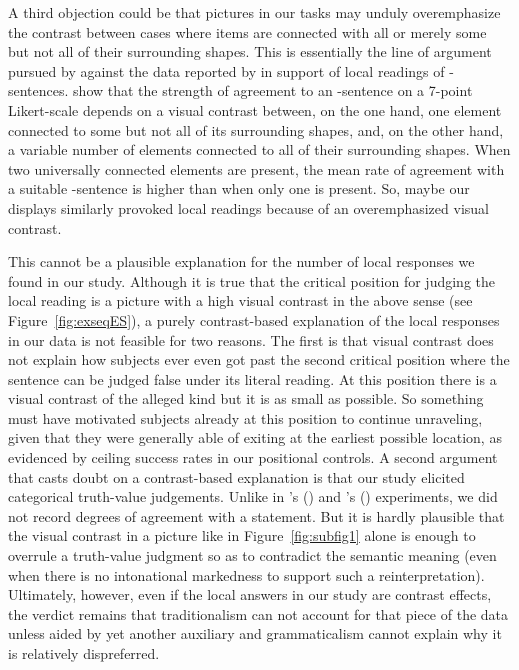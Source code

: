 \documentclass[fleqn,reqno,10pt,draft]{article}
\renewcommand{\es}{\acro{es}}
\begin{document}
A third objection could be that pictures in our tasks may unduly
overemphasize the contrast between cases where items are connected
with all or merely some but not all of their surrounding shapes. This
is essentially the line of argument pursued by
\citet{GeurtsTielvan-Tiel2013:Scalar-expressi} against the data
reported by \citet{ChemlaSpector2010:Experimental-Ev} in support of
local readings of
\es-sentences. \citeauthor{GeurtsTielvan-Tiel2013:Scalar-expressi}
show that the strength of agreement to an \es-sentence on a 7-point
Likert-scale depends on a visual contrast between, on the one hand,
one element connected to some but not all of its surrounding shapes,
and, on the other hand, a variable number of elements connected to all
of their surrounding shapes. When two universally connected elements
are present, the mean rate of agreement with a suitable \es-sentence
is higher than when only one is present. So, maybe our displays
similarly provoked local readings because of an overemphasized visual
contrast.

This cannot be a plausible explanation for the number of local
responses we found in our study. Although it is true that the critical
position for judging the local reading is a picture with a high visual
contrast in the above sense (see Figure~\ref{fig:exseqES}), a purely
contrast-based explanation of the local responses in our data is not
feasible for two reasons. The first is that visual contrast does not
explain how subjects ever even got past the second critical position
where the sentence can be judged false under its literal reading. At
this position there is a visual contrast of the alleged kind but it is
as small as possible. So something must have motivated subjects
already at this position to continue unraveling, given that they were
generally able of exiting at the earliest possible location, as
evidenced by ceiling success rates in our positional controls. A second
argument that casts doubt on a contrast-based explanation is that our
study elicited categorical truth-value judgements. Unlike in
\citeauthor{ChemlaSpector2010:Experimental-Ev}'s
(\citeyear{ChemlaSpector2010:Experimental-Ev}) and
\citeauthor{GeurtsTielvan-Tiel2013:Scalar-expressi}'s
(\citeyear{GeurtsTielvan-Tiel2013:Scalar-expressi}) experiments, we
did not record degrees of agreement with a statement. But it is hardly
plausible that the visual contrast in a picture like in
Figure~\ref{fig:subfig1} alone is enough to overrule a truth-value
judgment so as to contradict the semantic meaning (even when there is
no intonational markedness to support such a
reinterpretation). Ultimately, however, even if the local answers in
our study are contrast effects, the verdict remains that
traditionalism can not account for that piece of the data unless aided
by yet another auxiliary and grammaticalism cannot explain why it is
relatively dispreferred.
\end{document}
